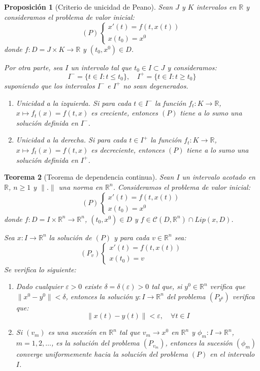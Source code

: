 \documentclass{report}
\newtheorem{theorem}{Teorema}[chapter]
\newtheorem{proposition}[theorem]{Proposición}
\theoremstyle{remark}
\theoremstyle{remark}
\theoremstyle{remark}
\theoremstyle{definition}
\theoremstyle{definition}
\theoremstyle{definition}
\begin{document}
\begin{proposition}[Criterio de unicidad de Peano]
    Sean $J$ y $K$ intervalos en $\mathbb{R}$ y consideramos el problema de valor inicial:
    $$(P) \begin{cases}
            x'(t) = f(t, x(t)) \\
            x(t_0) = x^0
        \end{cases}$$
    donde $f: D = J \times K \to \mathbb{R}$ y $(t_0, x^0) \in D$.

    Por otra parte, sea $I$ un intervalo tal que $t_0 \in I \subset J$ y consideramos:
    $$I^- = \{t \in I: t \leq t_0\}, \quad I^+ = \{t \in I: t \geq t_0\}$$
    suponiendo que los intervalos $I^-$ e $I^+$ no sean degenerados.
    \begin{enumerate}
        \item Unicidad a la izquierda. Si para cada $t \in I^-$ la función $f_t: K \to \mathbb{R}$, $x \mapsto f_t(x) = f(t, x)$ es creciente, entonces $(P)$ tiene a lo sumo una solución definida en $I^-$.
        \item Unicidad a la derecha. Si para cada $t \in I^+$ la función $f_t: K \to \mathbb{R}$, $x \mapsto f_t(x) = f(t, x)$ es decreciente, entonces $(P)$ tiene a lo sumo una solución definida en $I^+$.
    \end{enumerate}
\end{proposition}

\begin{theorem}[Teorema de dependencia continua]
    Sean $I$ un intervalo acotado en $\mathbb{R}$, $n \geq 1$ y $\|.\|$ una norma en $\mathbb{R}^n$.
    Consideramos el problema de valor inicial:
    $$(P) \begin{cases}
            x'(t) = f(t, x(t)) \\
            x(t_0) = x^0
        \end{cases}$$
    donde $f: D = I \times \mathbb{R}^n \to \mathbb{R}^n$, $(t_0, x^0) \in D$ y $f \in \mathcal{C}(D, \mathbb{R}^n) \cap Lip(x, D)$.

    Sea $x: I \to \mathbb{R}^n$ la solución de $(P)$ y para cada $v \in \mathbb{R}^n$ sea:
    $$(P_v) \begin{cases}
            x'(t) = f(t, x(t)) \\
            x(t_0) = v
        \end{cases}$$
    Se verifica lo siguiente:
    \begin{enumerate}
        \item Dado cualquier $\varepsilon > 0$ existe $\delta = \delta(\varepsilon) > 0$ tal que, si $y^0 \in \mathbb{R}^n$ verifica que $\|x^0 - y^0\| < \delta$, entonces la solución $y: I \to \mathbb{R}^n$ del problema $(P_{y^0})$ verifica que:
              $$\|x(t) - y(t)\| < \varepsilon, \quad \forall t \in I$$
        \item Si $(v_m)$ es una sucesión en $\mathbb{R}^n$ tal que $v_m \to x^0$ en $\mathbb{R}^n$ y $\phi_m: I \to \mathbb{R}^n$, $m = 1, 2, \dots$, es la solución del problema $(P_{v_m})$, entonces la sucesión $(\phi_m)$ converge uniformemente hacia la solución del problema $(P)$ en el intervalo $I$.
    \end{enumerate}
\end{theorem}
\end{document}
